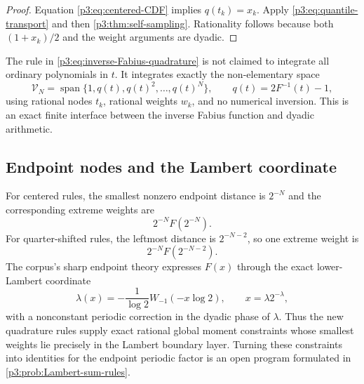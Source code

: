 \documentclass[11pt,oneside]{article}
\numberwithin{equation}{section}
\theoremstyle{definition}
\theoremstyle{remark}
\begin{document}
\begin{proof}
Equation \eqref{p3:eq:centered-CDF} implies $q(t_k)=x_k$.  Apply \eqref{p3:eq:quantile-transport} and then \cref{p3:thm:self-sampling}.  Rationality follows because both $(1+x_k)/2$ and the weight arguments are dyadic.
\end{proof}

\begin{remark}
The rule in \eqref{p3:eq:inverse-Fabius-quadrature} is not claimed to integrate all ordinary polynomials in $t$.  It integrates exactly the non-elementary space
\begin{equation}
 \mathcal V_N
 =\operatorname{span}\{1,q(t),q(t)^2,\ldots,q(t)^N\},
 \qquad q(t)=2F^{-1}(t)-1,
 \label{p3:eq:inverse-exactness-space}
\end{equation}
using rational nodes $t_k$, rational weights $w_k$, and no numerical inversion.  This is an exact finite interface between the inverse Fabius function and dyadic arithmetic.
\end{remark}

\subsection{Endpoint nodes and the Lambert coordinate}

For centered rules, the smallest nonzero endpoint distance is $2^{-N}$ and the corresponding extreme weights are
\begin{equation}
 2^{-N}F(2^{-N}).
 \label{p3:eq:centered-extreme-weight}
\end{equation}
For quarter-shifted rules, the leftmost distance is $2^{-N-2}$, so one extreme weight is
\begin{equation}
 2^{-N}F(2^{-N-2}).
 \label{p3:eq:quarter-extreme-weight}
\end{equation}
The corpus's sharp endpoint theory expresses $F(x)$ through the exact lower-Lambert coordinate
\begin{equation}
 \lambda(x)=-\frac1{\log2}W_{-1}(-x\log2),
 \qquad x=\lambda2^{-\lambda},
 \label{p3:eq:Lambert-coordinate}
\end{equation}
with a nonconstant periodic correction in the dyadic phase of $\lambda$.  Thus the new quadrature rules supply exact rational global moment constraints whose smallest weights lie precisely in the Lambert boundary layer.  Turning these constraints into identities for the endpoint periodic factor is an open program formulated in \cref{p3:prob:Lambert-sum-rules}.
\end{document}

